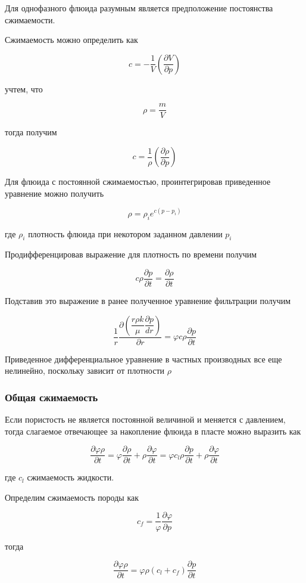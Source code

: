 Для однофазного флюида разумным является предположение постоянства сжимаемости.

Сжимаемость можно определить как 

$$c=-\frac{1}{V} \left(  \frac{ \partial V}{ \partial p}  \right) $$ 

учтем, что

$$ \rho = \frac{m}{V} $$  

тогда получим

$$c=\frac{1}{\rho} \left(  \frac{ \partial \rho}{ \partial p}  \right) $$ 

Для флюида с постоянной сжимаемостью, проинтегрировав приведенное уравнение можно получить 

$$\rho = \rho_i e^{c(p-p_i)}$$

где $\rho_i$ плотность флюида при некотором заданном давлении $p_i$

Продифференцировав выражение для плотность по времени получим 

$$
c \rho \frac{\partial p}{\partial t} = \frac{\partial \rho}{\partial t}
$$

Подставив это выражение в ранее полученное уравнение фильтрации получим 

$$ 
\frac{1}{r}\frac{\partial\left( \dfrac{r\rho k}{\mu}\dfrac{\partial p}{dr}\right)}{\partial r}=\varphi c \rho \frac{\partial p}{\partial t}  
$$

Приведенное дифференциальное уравнение в частных производных все еще нелинейно, поскольку зависит от плотности $\rho$ 



\subsubsection{Общая сжимаемость}
Если пористость не является постоянной величиной и меняется с давлением, тогда  слагаемое отвечающее за накопление флюида в пласте можно выразить как 


$$\frac{\partial \varphi \rho}{\partial t} = \varphi \frac{\partial \rho}{\partial t}+ \rho \frac{\partial \varphi }{\partial t} = \varphi c_l \rho \frac{\partial p}{\partial t} + \rho \frac{\partial \varphi }{\partial t}  $$

где $c_l$ сжимаемость жидкости. 

Определим сжимаемость породы как 

$$c_f = \frac{1}{\varphi} \frac{\partial \varphi}{\partial p}$$

тогда 

$$\frac{\partial \varphi \rho}{\partial t}  = \varphi \rho (c_l + c_f) \frac{\partial p}{\partial t}   $$



